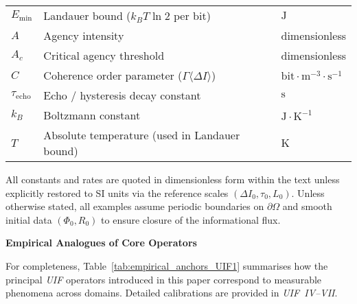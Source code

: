 \begin{longtable}{@{}%
  >{\RaggedRight\arraybackslash}p{}%
  >{\RaggedRight\arraybackslash}p{}%
  >{\RaggedRight\arraybackslash}p{}%
@{}}
$E_{\min}$ & Landauer bound ($k_{B}T\ln2$ per bit) & $\mathrm{J}$\\[3pt]
$A$ & Agency intensity & dimensionless\\[3pt]
$A_{c}$ & Critical agency threshold & dimensionless\\[3pt]
$C$ & Coherence order parameter ($\Gamma\langle\Delta I\rangle$) & $\mathrm{bit}\!\cdot\!\mathrm{m}^{-3}\!\cdot\!\mathrm{s}^{-1}$\\[3pt]
$\tau_{\text{echo}}$ & Echo / hysteresis decay constant & $\mathrm{s}$\\[3pt]
$k_{B}$ & Boltzmann constant & $\mathrm{J}\!\cdot\!\mathrm{K}^{-1}$\\[3pt]
$T$ & Absolute temperature (used in Landauer bound) & $\mathrm{K}$\\[3pt]
\end{longtable}

\vspace{0.5em}
\noindent
All constants and rates are quoted in dimensionless form within the text unless explicitly restored to SI units via the reference scales $(\Delta I_0,\tau_0,L_0)$.
Unless otherwise stated, all examples assume periodic boundaries on $\partial\Omega$
and smooth initial data $(\Phi_0,R_0)$ to ensure closure of the informational flux.

\vspace{1em}
\noindent\textbf{Empirical Analogues of Core Operators}

\noindent
For completeness, Table~\ref{tab:empirical_anchors_UIF1} summarises how the
principal \textit{UIF} operators introduced in this paper correspond to measurable
phenomena across domains. Detailed calibrations are provided in \textit{UIF~IV–VII}.

\vspace{0.5em}

